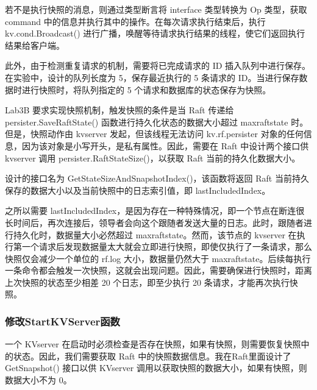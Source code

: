\documentclass[]{article}
\begin{document}
	若不是执行快照的消息，则通过类型断言将 interface{} 类型转换为 Op 类型，获取 command 中的信息并执行其中的操作。在每次请求执行结束后，执行 kv.cond.Broadcast() 进行广播，唤醒等待请求执行结果的线程，使它们返回执行结果给客户端。
	
	此外，由于检测重复请求的机制，需要将已完成请求的 ID 插入队列中进行保存。在实验中，设计的队列长度为 5，保存最近执行的 5 条请求的 ID。当进行保存数据时进行快照时，将队列指定的 5 个请求和数据库的状态保存为快照。
	
	Lab3B 要求实现快照机制，触发快照的条件是当 Raft 传递给 persister.SaveRaftState() 函数进行持久化状态的数据大小超过 maxraftstate 时。但是，快照动作由 kvserver 发起，但该线程无法访问 kv.rf.persister 对象的任何信息，因为该对象是小写开头，是私有属性。因此，需要在 Raft 中设计两个接口供 kvserver 调用 persister.RaftStateSize()，以获取 Raft 当前的持久化数据大小。
	
	设计的接口名为 GetStateSizeAndSnapshotIndex()，该函数将返回 Raft 当前持久保存的数据大小以及当前快照中的日志索引值，即 lastIncludedIndex。
	
	之所以需要 lastIncludedIndex，是因为存在一种特殊情况，即一个节点在断连很长时间后，再次连接后，领导者会向这个跟随者发送大量的日志。此时，跟随者进行持久化时，数据量大小必然超过 maxraftstate。然而，该节点的 kvserver 在执行第一个请求后发现数据量太大就会立即进行快照，即使仅执行了一条请求，那么快照仅会减少一个单位的 rf.log 大小，数据量仍然大于 maxraftstate。后续每执行一条命令都会触发一次快照，这就会出现问题。因此，需要确保进行快照时，距离上次快照的状态至少相差 20 个日志，即至少执行 20 条请求，才能再次执行快照。
	
	\subsubsection{修改StartKVServer函数}
	一个 KVserver 在启动时必须检查是否存在快照，如果有快照，则需要恢复快照中的状态。因此，我们需要获取 Raft 中的快照数据信息。我在Raft里面设计了 GetSnapshot() 接口以供 KVserver 调用以获取快照的数据大小，如果有快照，则数据大小不为 0。
	
\end{document}
